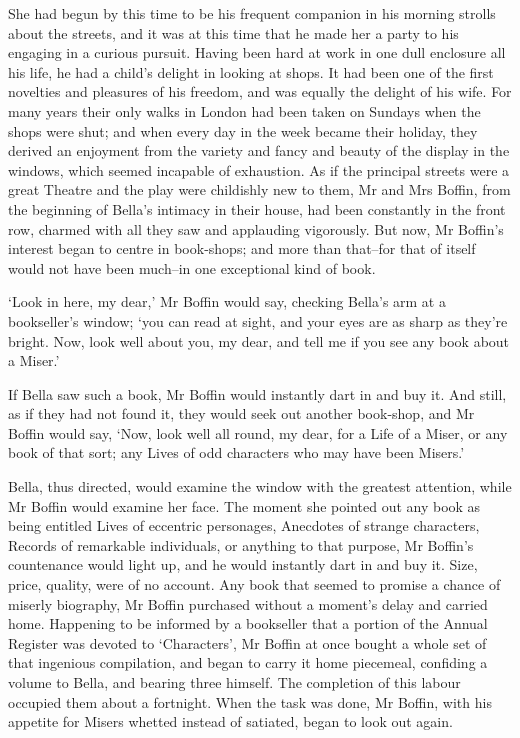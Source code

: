 She had begun by this time to be his frequent companion in his morning
strolls about the streets, and it was at this time that he made her a
party to his engaging in a curious pursuit. Having been hard at work in
one dull enclosure all his life, he had a child’s delight in looking
at shops. It had been one of the first novelties and pleasures of his
freedom, and was equally the delight of his wife. For many years their
only walks in London had been taken on Sundays when the shops were shut;
and when every day in the week became their holiday, they derived an
enjoyment from the variety and fancy and beauty of the display in the
windows, which seemed incapable of exhaustion. As if the principal
streets were a great Theatre and the play were childishly new to them,
Mr and Mrs Boffin, from the beginning of Bella’s intimacy in their
house, had been constantly in the front row, charmed with all they saw
and applauding vigorously. But now, Mr Boffin’s interest began to centre
in book-shops; and more than that--for that of itself would not have
been much--in one exceptional kind of book.

‘Look in here, my dear,’ Mr Boffin would say, checking Bella’s arm at a
bookseller’s window; ‘you can read at sight, and your eyes are as sharp
as they’re bright. Now, look well about you, my dear, and tell me if you
see any book about a Miser.’

If Bella saw such a book, Mr Boffin would instantly dart in and buy
it. And still, as if they had not found it, they would seek out another
book-shop, and Mr Boffin would say, ‘Now, look well all round, my
dear, for a Life of a Miser, or any book of that sort; any Lives of odd
characters who may have been Misers.’

Bella, thus directed, would examine the window with the greatest
attention, while Mr Boffin would examine her face. The moment she
pointed out any book as being entitled Lives of eccentric personages,
Anecdotes of strange characters, Records of remarkable individuals, or
anything to that purpose, Mr Boffin’s countenance would light up, and
he would instantly dart in and buy it. Size, price, quality, were of no
account. Any book that seemed to promise a chance of miserly biography,
Mr Boffin purchased without a moment’s delay and carried home. Happening
to be informed by a bookseller that a portion of the Annual Register was
devoted to ‘Characters’, Mr Boffin at once bought a whole set of that
ingenious compilation, and began to carry it home piecemeal, confiding
a volume to Bella, and bearing three himself. The completion of this
labour occupied them about a fortnight. When the task was done, Mr
Boffin, with his appetite for Misers whetted instead of satiated, began
to look out again.


